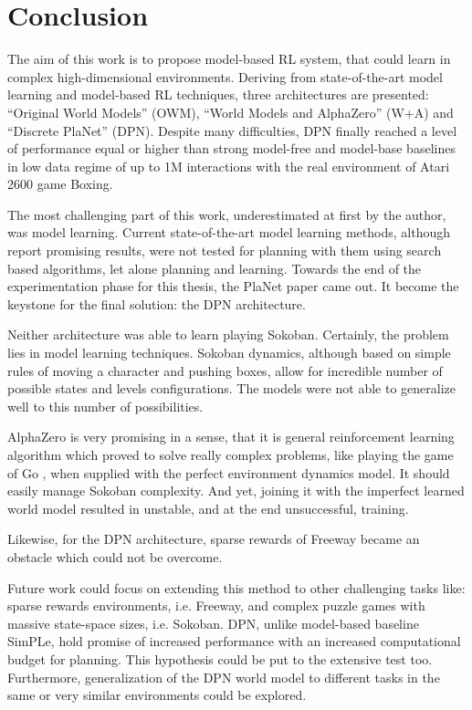 \section{Conclusion}

The aim of this work is to propose model-based RL system, that could learn in complex high-dimensional environments. Deriving from state-of-the-art model learning \cite{Algo.RecurrentEnvSim}\cite{Algo.JointFrameRewardPrediction}\cite{Algo.FastGenerativeModels} and model-based RL \cite{Algo.SimPLe}\cite{Algo.VPN}\cite{Algo.WorldModels}\cite{Algo.PlaNet} techniques, three architectures are presented: ``Original World Models'' (OWM), ``World Models and AlphaZero'' (W+A) and ``Discrete PlaNet'' (DPN). Despite many difficulties, DPN finally reached a level of performance equal or higher than strong model-free and model-base baselines in low data regime of up to 1M interactions with the real environment of Atari 2600 game Boxing.

The most challenging part of this work, underestimated at first by the author, was model learning. Current state-of-the-art model learning methods, although report promising results, were not tested for planning with them using search based algorithms, let alone planning and learning. Towards the end of the experimentation phase for this thesis, the PlaNet paper came out. It become the keystone for the final solution: the DPN architecture.

Neither architecture was able to learn playing Sokoban. Certainly, the problem lies in model learning techniques. Sokoban dynamics, although based on simple rules of moving a character and pushing boxes, allow for incredible number of possible states and levels configurations. The models were not able to generalize well to this number of possibilities.

AlphaZero is very promising in a sense, that it is general reinforcement learning algorithm which proved to solve really complex problems, like playing the game of Go \cite{Algo.AlphaGoZero}, when supplied with the perfect environment dynamics model. It should easily manage Sokoban complexity. And yet, joining it with the imperfect learned world model resulted in unstable, and at the end unsuccessful, training. 

Likewise, for the DPN architecture, sparse rewards of Freeway became an obstacle which could not be overcome.

Future work could focus on extending this method to other challenging tasks like: sparse rewards environments, i.e. Freeway, and complex puzzle games with massive state-space sizes, i.e. Sokoban.
DPN, unlike model-based baseline SimPLe, hold promise of increased performance with an increased computational budget for planning. This hypothesis could be put to the extensive test too.
Furthermore, generalization of the DPN world model to different tasks in the same or very similar environments could be explored.

